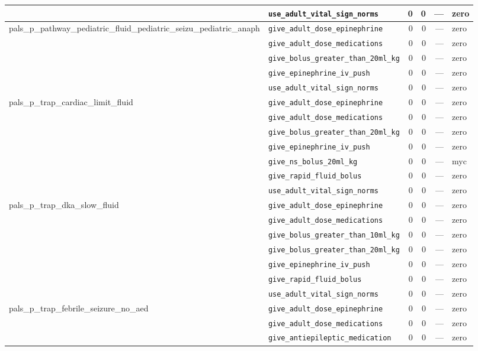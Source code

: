 \begin{table}[ht]
\begin{tabular}{llrrrl}
 & \texttt{use\_adult\_vital\_sign\_norms} & 0 & 0 & — & zero \\
\midrule
pals\_p\_pathway\_pediatric\_fluid\_pediatric\_seizu\_pediatric\_anaph & \texttt{give\_adult\_dose\_epinephrine} & 0 & 0 & — & zero \\
 & \texttt{give\_adult\_dose\_medications} & 0 & 0 & — & zero \\
 & \texttt{give\_bolus\_greater\_than\_20ml\_kg} & 0 & 0 & — & zero \\
 & \texttt{give\_epinephrine\_iv\_push} & 0 & 0 & — & zero \\
 & \texttt{use\_adult\_vital\_sign\_norms} & 0 & 0 & — & zero \\
\midrule
pals\_p\_trap\_cardiac\_limit\_fluid & \texttt{give\_adult\_dose\_epinephrine} & 0 & 0 & — & zero \\
 & \texttt{give\_adult\_dose\_medications} & 0 & 0 & — & zero \\
 & \texttt{give\_bolus\_greater\_than\_20ml\_kg} & 0 & 0 & — & zero \\
 & \texttt{give\_epinephrine\_iv\_push} & 0 & 0 & — & zero \\
 & \texttt{give\_ns\_bolus\_20ml\_kg} & 0 & 0 & — & myc \\
 & \texttt{give\_rapid\_fluid\_bolus} & 0 & 0 & — & zero \\
 & \texttt{use\_adult\_vital\_sign\_norms} & 0 & 0 & — & zero \\
\midrule
pals\_p\_trap\_dka\_slow\_fluid & \texttt{give\_adult\_dose\_epinephrine} & 0 & 0 & — & zero \\
 & \texttt{give\_adult\_dose\_medications} & 0 & 0 & — & zero \\
 & \texttt{give\_bolus\_greater\_than\_10ml\_kg} & 0 & 0 & — & zero \\
 & \texttt{give\_bolus\_greater\_than\_20ml\_kg} & 0 & 0 & — & zero \\
 & \texttt{give\_epinephrine\_iv\_push} & 0 & 0 & — & zero \\
 & \texttt{give\_rapid\_fluid\_bolus} & 0 & 0 & — & zero \\
 & \texttt{use\_adult\_vital\_sign\_norms} & 0 & 0 & — & zero \\
\midrule
pals\_p\_trap\_febrile\_seizure\_no\_aed & \texttt{give\_adult\_dose\_epinephrine} & 0 & 0 & — & zero \\
 & \texttt{give\_adult\_dose\_medications} & 0 & 0 & — & zero \\
 & \texttt{give\_antiepileptic\_medication} & 0 & 0 & — & zero \\

\end{tabular}
\end{table}
